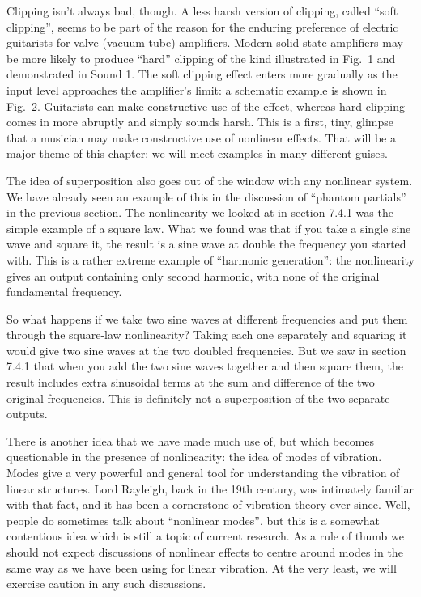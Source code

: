 \audio{}

  Clipping isn’t always bad, though. A less harsh version of clipping, called 
  “soft clipping”, seems to be part of the reason for the enduring preference 
  of electric guitarists for valve (vacuum tube) amplifiers. Modern solid-state 
  amplifiers may be more likely to produce “hard” clipping of the kind 
  illustrated in Fig.\ 1 and demonstrated in Sound 1. The soft clipping effect 
  enters more gradually as the input level approaches the amplifier's limit: a 
  schematic example is shown in Fig.\ 2. Guitarists can make constructive use 
  of the effect, whereas hard clipping comes in more abruptly and simply sounds 
  harsh. This is a first, tiny, glimpse that a musician may make constructive 
  use of nonlinear effects. That will be a major theme of this chapter: we will 
  meet examples in many different guises. 


\audio{}

  The idea of superposition also goes out of the window with any nonlinear 
  system. We have already seen an example of this in the discussion of “phantom 
  partials” in the previous section. The nonlinearity we looked at in section 
  7.4.1 was the simple example of a square law. What we found was that if you 
  take a single sine wave and square it, the result is a sine wave at double 
  the frequency you started with. This is a rather extreme example of 
  ``harmonic generation'': the nonlinearity gives an output containing only 
  second harmonic, with none of the original fundamental frequency. 

  So what happens if we take two sine waves at different frequencies and put 
  them through the square-law nonlinearity? Taking each one separately and 
  squaring it would give two sine waves at the two doubled frequencies. But we 
  saw in section 7.4.1 that when you add the two sine waves together and then 
  square them, the result includes extra sinusoidal terms at the sum and 
  difference of the two original frequencies. This is definitely not a 
  superposition of the two separate outputs. 

  There is another idea that we have made much use of, but which becomes 
  questionable in the presence of nonlinearity: the idea of modes of vibration. 
  Modes give a very powerful and general tool for understanding the vibration 
  of linear structures. Lord Rayleigh, back in the 19th century, was intimately 
  familiar with that fact, and it has been a cornerstone of vibration theory 
  ever since. Well, people do sometimes talk about “nonlinear modes”, but this 
  is a somewhat contentious idea which is still a topic of current research. As 
  a rule of thumb we should not expect discussions of nonlinear effects to 
  centre around modes in the same way as we have been using for linear 
  vibration. At the very least, we will exercise caution in any such 
  discussions. 

